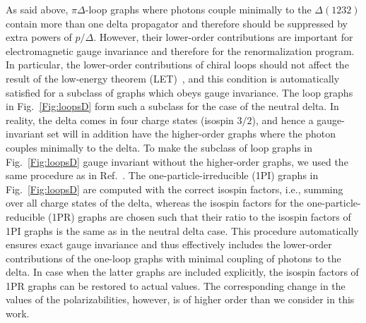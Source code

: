 \documentclass[twocolumn,prc,showpacs,nofootinbib,preprintnumbers,amsmath,amssymb,superscriptaddress]{revtex4-1}
\begin{document}
As said above, $\pi \Delta$-loop graphs where photons couple minimally to the $\Delta(1232)$ contain more 
than one delta propagator and therefore should be suppressed by extra powers of $p/\varDelta$.
However, their lower-order contributions are important for electromagnetic gauge invariance and therefore for the 
renormalization program. In particular, the lower-order contributions of chiral loops should not affect the result of the low-energy
theorem (LET)~\cite{Low:1954kd}, and this condition is automatically satisfied for a subclass of graphs which obeys gauge invariance. The loop graphs in 
Fig.~\ref{Fig:loopsD} form such a subclass for the case of the neutral delta. In reality, the delta comes in four charge states (isospin $3/2$), and hence a 
gauge-invariant set will in addition have the higher-order graphs where the photon couples minimally to the delta. To make the subclass of loop graphs 
in Fig.~\ref{Fig:loopsD} gauge invariant without the higher-order graphs, we used the same procedure as in Ref.~\cite{Lensky:2009uv}. The one-particle-irreducible (1PI) graphs in Fig.~\ref{Fig:loopsD} are computed with the correct isospin factors, i.e., summing over all charge 
states of the delta, whereas the isospin factors for the one-particle-reducible (1PR) graphs are chosen such that their ratio to the isospin factors
of 1PI graphs is the same as in the neutral delta case. This procedure automatically ensures exact gauge invariance and thus 
effectively includes the lower-order contributions of the one-loop graphs with minimal coupling of photons to the delta. In case when the latter graphs 
are included explicitly, the isospin factors of 1PR graphs can be restored to actual values.
The corresponding change in the values of the polarizabilities, however, is of higher order than we consider in this work.
\end{document}
